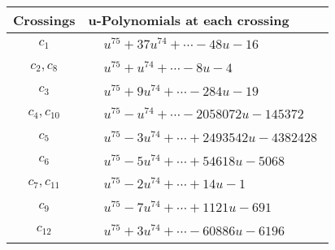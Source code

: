 \documentclass[1p]{elsarticle_modified}
\theoremstyle{definition}
\begin{document}
\begin{tabular}{m{50pt}|m{274pt}}
Crossings & \hspace{64pt}u-Polynomials at each crossing \\
\hline $$\begin{aligned}c_{1}\end{aligned}$$&$\begin{aligned}
&u^{75}+37 u^{74}+\cdots-48 u-16
\end{aligned}$\\
\hline $$\begin{aligned}c_{2},c_{8}\end{aligned}$$&$\begin{aligned}
&u^{75}+u^{74}+\cdots-8 u-4
\end{aligned}$\\
\hline $$\begin{aligned}c_{3}\end{aligned}$$&$\begin{aligned}
&u^{75}+9 u^{74}+\cdots-284 u-19
\end{aligned}$\\
\hline $$\begin{aligned}c_{4},c_{10}\end{aligned}$$&$\begin{aligned}
&u^{75}- u^{74}+\cdots-2058072 u-145372
\end{aligned}$\\
\hline $$\begin{aligned}c_{5}\end{aligned}$$&$\begin{aligned}
&u^{75}-3 u^{74}+\cdots+2493542 u-4382428
\end{aligned}$\\
\hline $$\begin{aligned}c_{6}\end{aligned}$$&$\begin{aligned}
&u^{75}-5 u^{74}+\cdots+54618 u-5068
\end{aligned}$\\
\hline $$\begin{aligned}c_{7},c_{11}\end{aligned}$$&$\begin{aligned}
&u^{75}-2 u^{74}+\cdots+14 u-1
\end{aligned}$\\
\hline $$\begin{aligned}c_{9}\end{aligned}$$&$\begin{aligned}
&u^{75}-7 u^{74}+\cdots+1121 u-691
\end{aligned}$\\
\hline $$\begin{aligned}c_{12}\end{aligned}$$&$\begin{aligned}
&u^{75}+3 u^{74}+\cdots-60886 u-6196
\end{aligned}$\\
\hline
\end{tabular}\\~\\
\end{document}
